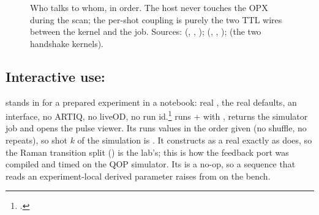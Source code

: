 \begin{figure}[htbp]
\caption{Who talks to whom, in order. The host never touches the OPX during
the scan; the per-shot coupling is purely the two TTL wires between the
kernel and the job. Sources:  (,
, ); 
(, , );
 (the two handshake kernels).}
\label{fig:sequence}
\end{figure}

\subsection{Interactive use: }

 stands in for a prepared experiment in a notebook: real
, the real  defaults, an 
interface, no ARTIQ, no liveOD, no run id.\footnote{.}
 runs  +
 with , returns
the simulator job and opens the pulse viewer. Its  runs values in
the order given (no shuffle, no repeats), so shot $k$ of the simulation is
. It constructs  as a real
 exactly as  does, so the
Raman transition split () is the lab's; this
is how the feedback port was compiled and timed on the QOP simulator. Its
 is a no-op, so a sequence that reads an
experiment-local derived parameter raises  from
 on the bench.
